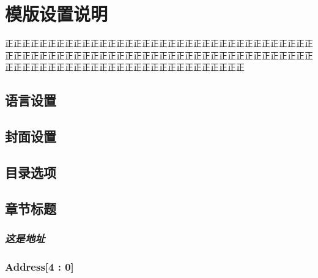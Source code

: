 
\chapter{模版设置说明}
正正正正正正正正正正正正正正正正正正正正正正正正正正正正正正正正正正正正正正正正正正正正正正正正正正正正正正正正正正正正正正正正正正正正正正正正正正正正正正正正正正正正正正正正正正正正正正正正正正正正

\section{语言设置}
    \lipsum[1]

\section{封面设置}
    \lipsum[1]

\section{目录选项}
    \lipsum[1]

\section{章节标题}
    \subsection*{\textit{\textbf{这是地址}}}
    \zhlipsum[1]

    \subsection*{\textbf{Address[4 : 0]}}
    \lipsum[1]\\

